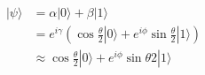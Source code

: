 \documentclass[preview]{standalone}
\begin{document}
\begin{align*}
|\psi\rangle &= \alpha |0\rangle + \beta |1\rangle \\ &=e^{i\gamma} \left(\cos{\frac{\theta}{2}} |0\rangle + e^{i\phi}\sin{\frac{\theta}{2}}|1\rangle\right) \\ & \approx \cos{\frac{\theta}{2} |0\rangle + e^{i\phi}\sin{\theta}{2} |1\rangle}
\end{align*}
\end{document}
